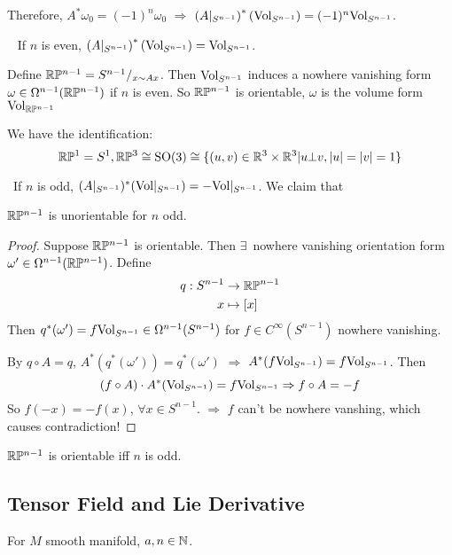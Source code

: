 Therefore,  $ A^*\omega_0=(-1)^{n} \omega_0$ $ \Rightarrow  $  $ \left(A|_{S^{n-1}}\right)^*(\mathrm{Vol}_{S^{n-1}})=(-1)^n\mathrm{Vol}_{S^{n-1}} $. 

\noindent{}\,\,\, If  $ n  $ is even,   $ \left(A|_{S^{n-1}}\right)^*(\mathrm{Vol}_{S^{n-1}})=\mathrm{Vol}_{S^{n-1}} $.

Define  $ \mathbb R\mathbb P^{n-1}=S^{n-1}/_{x\sim Ax} $. Then  $ \mathrm{Vol}_{S^{n-1}} $ induces a nowhere vanishing form  $ \omega\in \Omega^{n-1}(\mathbb R\mathbb P^{n-1}) $ if  $ n $ is even. So  $ \mathbb R\mathbb P^{n-1} $ is orientable,  $ \omega  $ is the volume form $ \mathrm{Vol}_{\mathbb R\mathbb P^{n-1}} $   

\begin{proposition}
    We have the identification: \[\mathbb R\mathbb P^1=S^1,\mathbb R\mathbb P^3\cong \mathrm{SO}(3)\cong\{(u,v)\in\mathbb R^3\times\mathbb R^3|u\bot v,|u|=|v|=1\} \] 
\end{proposition}

\noindent{}\,\,\,If  $ n  $ is odd,  $ (A|_{S^{n-1}})^*(\mathrm{Vol}|_{S^{n-1}})=-\mathrm{Vol}|_{S^{n-1}} $. We claim that 
\begin{proposition}
     $ \mathbb R\mathbb P^{n-1} $ is unorientable for  $ n $ odd.  
\end{proposition} 
\begin{proof}
    Suppose  $ \mathbb R\mathbb P^{n-1} $ is orientable. Then  $ \exists  $\, nowhere vanishing orientation form  $ \omega'\in\Omega^{n-1}(\mathbb R\mathbb P^{n-1}) $. Define 
    \begin{align*}
        q:S^{n-1}&\rightarrow\mathbb R\mathbb P^{n-1}\\
        x&\mapsto [x]
    \end{align*}  
    Then  $ q^*(\omega')=f\mathrm{Vol}_{S^{n-1}}\in\Omega^{n-1}(S^{n-1}) $ for  $ f \in C^\infty(S^{n-1}) $ nowhere vanishing.

    By  $ q\circ A=q $,  $ A^*(q^*(\omega'))=q^*(\omega') $ $ \Rightarrow $ $ A^*(f\mathrm{Vol}_{S^{n-1}})=f\mathrm{Vol}_{S^{n-1}} $. Then 
    \begin{equation}
        (f\circ A)\cdot A^*(\mathrm{Vol}_{S^{n-1}})=f\mathrm{Vol}_{S^{n-1}}\Rightarrow f\circ A=-f
    \end{equation}  
    So  $ f(-x)=-f(x) $, $ \forall x\in S^{n-1} $. $ \Rightarrow  $  $ f  $ can't be nowhere vanshing, which causes contradiction!  
\end{proof}
\begin{theorem}
     $ \mathbb R\mathbb P^{n-1} $ is orientable iff  $ n  $ is odd. 
\end{theorem}

\subsection{Tensor Field and Lie Derivative}
For  $ M  $ smooth manifold,  $ a,n\in \mathbb N $.

